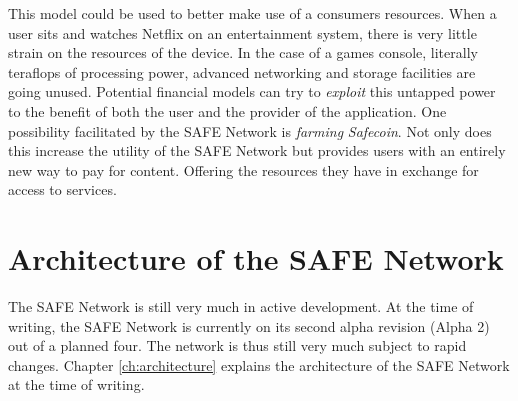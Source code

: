 This model could be used to better make use of a consumers resources. When a user sits and watches Netflix on an entertainment system, there is very little strain on the resources of the device. In the case of a games console, literally teraflops of processing power, advanced networking and storage facilities are going unused. Potential financial models can try to \textit{exploit} this untapped power to the benefit of both the user and the provider of the application. One possibility facilitated by the SAFE Network is \textit{farming} \textit{Safecoin}. Not only does this increase the utility of the SAFE Network but provides users with an entirely new way to pay for content. Offering the resources they have in exchange for access to services.

\section{Architecture of the SAFE Network}

The SAFE Network is still very much in active development. At the time of writing, the SAFE Network is currently on its second alpha revision (Alpha 2) out of a planned four. The network is thus still very much subject to rapid changes. Chapter \ref{ch:architecture} explains the architecture of the SAFE Network at the time of writing.
